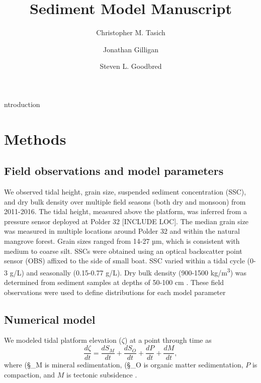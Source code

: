 \documentclass[9pt,twocolumn,twoside,lineno]{pnas-new}
\title{Sediment Model Manuscript}
\author[a]{Christopher M. Tasich}
\author[a]{Jonathan Gilligan}
\author[a]{Steven L. Goodbred}
\affil[a]{Vanderbilt University}
\begin{document}
	
	\maketitle	
	\thispagestyle{firststyle}
	
	ntroduction
	
	\bigskip
	\bigskip
	\bigskip
	\bigskip
	\bigskip
	\bigskip
	\bigskip
	\bigskip
	\bigskip
	\bigskip
	\bigskip
	\bigskip
	\bigskip
	
	
	\section*{Methods}
	
	\subsection*{Field observations and model parameters}
	
	We observed tidal height, grain size, suspended sediment concentration (SSC), and dry bulk density over multiple field seasons (both dry and monsoon) from 2011-2016. The tidal height, measured above the platform, was inferred from a pressure sensor deployed at Polder 32 [INCLUDE LOC]. The median grain size was measured in multiple locations around Polder 32 and within the natural mangrove forest. Grain sizes ranged from 14-27 µm, which is consistent with medium to coarse silt. SSCs were obtained using an optical backscatter point sensor (OBS) affixed to the side of small boat. SSC varied within a tidal cycle (0-3 g/L) and seasonally (0.15-0.77 g/L). Dry bulk density (900-1500 kg/m\textsuperscript{3}) was determined from sediment samples at depths of 50-100 cm \cite{auerbachFloodRiskNatural2015}. These field observations were used to define distributions for each model parameter 
	
	
	\subsection*{Numerical model}
		
	We modeled tidal platform elevation (\(\zeta\)) at a point through time as 	
	\begin{equation}\label{eq1}
	\frac{d \zeta}{d t} = \frac{d S_M}{d t} + \frac{d S_O}{d t} + \frac{d P}{d t} + \frac{d M}{d t},
	\end{equation}
	where (\S_M\) is mineral sedimentation, (\S_O\) is organic matter sedimentation, $P$ is compaction, and $M$ is tectonic subsidence \cite{frenchNumericalSimulationVertical1993,temmermanModellingLongtermTidal2003,temmermanModellingEstuarineVariations2004}.
	
\end{document}

